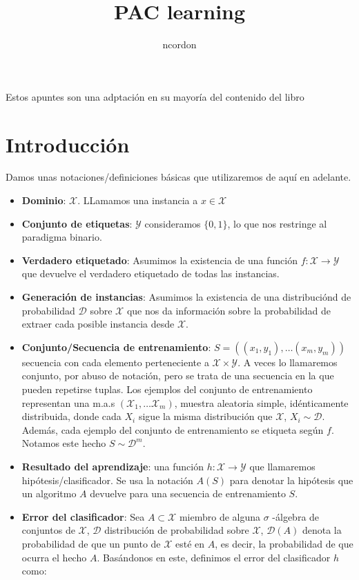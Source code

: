 \documentclass[11pt]{article}
\author{ncordon}
\date{}
\title{PAC learning}
\begin{document}
\maketitle
\tableofcontents

\hfill
Estos apuntes son una adptación en su mayoría del contenido del libro \cite{shwartz_understanding_ml}

\section{Introducción}
\label{sec-1}
Damos unas notaciones/definiciones básicas que utilizaremos de aquí en adelante.

\begin{itemize}
\item \textbf{Dominio}: $\mathcal{X}$. LLamamos una instancia a $x\in \mathcal{X}$
\item \textbf{Conjunto de etiquetas}: $\mathcal{Y}$ consideramos $\{0,1\}$, lo que nos restringe al paradigma binario.
\item \textbf{Verdadero etiquetado}: Asumimos la existencia de una función $f: \mathcal{X} \rightarrow \mathcal{Y}$ que devuelve el verdadero etiquetado de todas las instancias.
\item \textbf{Generación de instancias}: Asumimos la existencia de una distribuciónd de probabilidad $\mathcal{D}$ sobre $\mathcal{X}$ que nos da información sobre la probabilidad de extraer cada posible instancia desde $\mathcal{X}$.
\item \textbf{Conjunto/Secuencia de entrenamiento}: $S = ((x_1,y_1), \ldots (x_m, y_m))$ secuencia con cada elemento perteneciente a $\mathcal{X}\times \mathcal{Y}$. A veces lo llamaremos conjunto, por abuso de notación, pero se trata de una secuencia en la que pueden repetirse tuplas. Los ejemplos del conjunto de entrenamiento representan una m.a.s $(\mathcal{X}_1,\ldots \mathcal{X}_m)$, muestra aleatoria simple, idénticamente distribuida, donde cada $X_i$ sigue la misma distribución que $\mathcal{X}$, $X_i \sim \mathcal{D}$. Además, cada ejemplo del conjunto de entrenamiento se etiqueta según $f$. Notamos este hecho $S \sim \mathcal{D}^m$.
\item \textbf{Resultado del aprendizaje}: una función $h: \mathcal{X} \rightarrow \mathcal{Y}$ que llamaremos hipótesis/clasificador. Se usa la notación $A(S)$ para denotar la hipótesis que un algoritmo $A$ devuelve para una secuencia de entrenamiento $S$.
\item \textbf{Error del clasificador}: Sea $A \subset \mathcal{X}$ miembro de alguna $\sigma$ -álgebra de conjuntos de $\mathcal{X}$, $\mathcal{D}$ distribución de probabilidad sobre $\mathcal{X}$, $\mathcal{D}(A)$ denota la probabilidad de que un punto de $\mathcal{X}$ esté en $A$, es decir, la probabilidad de que ocurra el hecho $A$. Basándonos en este, definimos el error del clasificador $h$ como:
\end{itemize}
\end{document}
